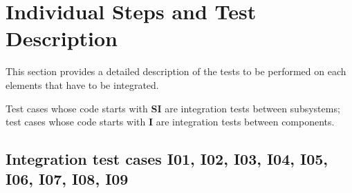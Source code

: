 \section{Individual Steps and Test Description} \label{sec individual steps}

This section provides a detailed description of the tests to be performed on each elements that have to be integrated.

Test cases whose code starts with \textbf{SI} are integration tests between subsystems; test cases whose code starts with \textbf{I} are integration tests between components.

\subsection {Integration test cases I01, I02, I03, I04, I05, I06, I07, I08, I09}

\indent

\vspace{1em}

